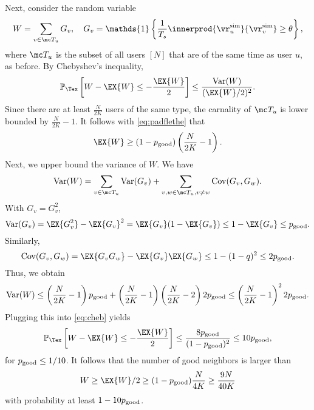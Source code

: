 \documentclass{article}
\newcommand{\vratingS}{\vocrating^{\text{sim}}}
\newcommand\vocrating{\vr}
\newcommand\ind[1]{\mathds{1}\left\{#1\right\}}
\renewcommand\PR[2][\Tex]{
\ifthenelse{\equal{#1}{}}{{\mathbb P}\left[#2\right]}{\ensuremath{{\mathbb P}_{#1}\left[ #2\right]}}}
\begin{document}
Next, consider the random variable 
\[
W 
= \sum_{v \in \mc T_u} G_v,
\quad G_v  %
= \ind{ \frac{1}{T_s} \innerprod{\vratingS_u }{\vratingS_v}  \geq \theta },
\]
where $\mc T_u$ is the subset of all users $[N]$ that are of the same time as user $u$, as before. By Chebyshev's inequality, 
\begin{align}
\PR{W - \EX{ W } \leq - \frac{\EX{W}}{2} }
\leq 
\frac{\mathrm{Var}(W)}{ ( \EX{W}/2 )^2 }.
\label{eq:cheb}
\end{align}
Since there are at least $\frac{N}{2K}$ users of the same type, the carnality of $\mc T_u$ is lower bounded by $\frac{N}{2K}-1$. It follows with \eqref{eq:padflethe} that 
\[
\EX{W} \geq (1-\perrg) \left(\frac{N}{2K}-1\right).
\]
Next, we upper bound the variance of $W$. We have
\[
\mathrm{Var}(W) = \sum_{v\in \mc T_u} \mathrm{Var}(G_v) + \sum_{v, w \in \mc T_u, v\neq w} \mathrm{Cov}(G_v, G_w).
\]
With $G_v = G_v^2$, 
\[
\mathrm{Var}(G_v) = \EX{G_v^2} - \EX{G_v}^2 = \EX{G_v}(1 - \EX{G_v}) \leq 1 - \EX{G_v} \leq \perrg. 
\]
Similarly, 
\[
\mathrm{Cov}(G_v,G_w) = \EX{G_v G_w} - \EX{G_v}\EX{G_w} \leq 1 - (1-q)^2 \leq 2 \perrg.
\]
Thus, we obtain 
\[
\mathrm{Var}(W) \leq \left( \frac{N}{2K} - 1 \right) p_{\mathrm{good}} +  \left( \frac{N}{2K} -1 \right)  \left( \frac{N}{2K} -2 \right) 2 p_{\mathrm{good}}
\leq 
\left( \frac{N}{2K} - 1 \right)^2 2 p_{\mathrm{good}}. 
\]
Plugging this into \eqref{eq:cheb} yields 
\[
\PR{W - \EX{ W } \leq - \frac{\EX{W}}{2} }
\leq 
\frac{8\perrg}{ (1 - \perrg)^2 } \leq 10 \perrg,
\]
for $p_{\mathrm{good}} \leq 1/10$. 
It follows that the number of good neighbors is larger than
\[
W \geq \EX{W}/2 \geq (1 - \perrg) \frac{N}{4K} \geq \frac{9 N}{40 K}
\]
with probability at least $1 - 10 p_{\mathrm{good}}$. %

\end{document}
